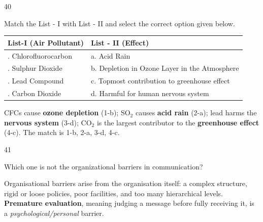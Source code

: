 \begin{question}{40}
{Match the List - I with List - II and select the correct option given below.\par\smallskip\begin{tabularx}{\linewidth}{@{}>{\raggedright\arraybackslash}X>{\raggedright\arraybackslash}X@{}}\toprule
\textbf{List-I (Air Pollutant)} & \textbf{List - II (Effect)}\\\midrule
1. Chlorofluorocarbon & a. Acid Rain\\
2. Sulphur Dioxide & b. Depletion in Ozone Layer in the Atmosphere\\
3. Lead Compound & c. Topmost contribution to greenhouse effect\\
4. Carbon Dioxide & d. Harmful for human nervous system\\
\bottomrule\end{tabularx}\par\smallskip
\par}
\begin{explain}
CFCs cause \textbf{ozone depletion} (1-b); SO$_2$ causes \textbf{acid rain} (2-a); lead harms the \textbf{nervous system} (3-d); CO$_2$ is the largest contributor to the \textbf{greenhouse effect} (4-c). The match is 1-b, 2-a, 3-d, 4-c.
\end{explain}
\end{question}

\begin{question}{41}
{Which one is not the organizational barriers in communication?\par}
\begin{explain}
Organisational barriers arise from the organisation itself: a complex structure, rigid or loose policies, poor facilities, and too many hierarchical levels. \textbf{Premature evaluation}, meaning judging a message before fully receiving it, is a \emph{psychological/personal} barrier.
\end{explain}
\end{question}

